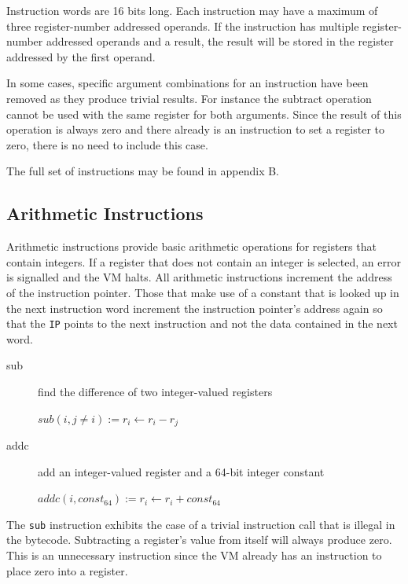 \documentclass[english,a4paper]{report}
\begin{document}
Instruction words are 16 bits long. Each instruction may have a
maximum of three register-number addressed operands. If the
instruction has multiple register-number addressed operands and a
result, the result will be stored in the register addressed by the
first operand.

In some cases, specific argument combinations for an instruction have
been removed as they produce trivial results. For instance the
subtract operation cannot be used with the same register for both
arguments. Since the result of this operation is always zero and there
already is an instruction to set a register to zero, there is no need
to include this case.

The full set of instructions may be found in appendix B.

\subsection{Arithmetic Instructions}

Arithmetic instructions provide basic arithmetic operations for registers that contain integers. If a register that does not contain
an integer is selected, an error is signalled and the VM halts. All
arithmetic instructions increment the address of the instruction pointer. Those that make use of a constant that is looked up in the next instruction word increment the instruction pointer's address again so that the \verb|IP| points to the next instruction and not the data contained in the next word.

\begin{description}
	\item[sub] find the difference of two integer-valued registers
	
	$sub(i, j\neq i) := r _{i} \longleftarrow  r _{i} - r _{j} $ \\	
	
	\item[addc] add an integer-valued register and a 64-bit integer
	constant
	
	$addc(i, const _{64}) := r _{i} \longleftarrow  r _{i} + const 
	_{64} $ \\
\end{description}

The \verb|sub| instruction exhibits the case of a trivial instruction call that is illegal in the bytecode. Subtracting a register's value from itself will always produce zero. This is an unnecessary instruction since the VM already has an instruction to place zero into a register.
\end{document}
